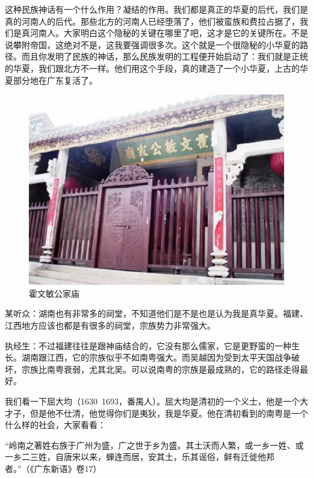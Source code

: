 这种民族神话有一个什么作用？凝结的作用。我们都是真正的华夏的后代，我们是真的河南人的后代。那些北方的河南人已经堕落了，他们被蛮族和费拉占据了，我们是真河南人。大家明白这个隐秘的关键在哪里了吧，这才是它的关键所在。不是说攀附帝国，这绝对不是，这我要强调很多次。这个就是一个很隐秘的小华夏的路径。而且你发明了民族的神话，那么民族发明的工程便开始启动了：我们就是正统的华夏，我们跟北方不一样。他们用这个手段，真的建造了一个小华夏，上古的华夏部分地在广东复活了。

\begin{figure}
	\centering
	\includegraphics[width=\textwidth]{images/image-59}
	\caption{霍文敏公家庙}
\end{figure}

\begin{quoted}
某听众：湖南也有非常多的祠堂，不知道他们是不是也是认为我是真华夏。福建、江西地方应该也都是有很多的祠堂，宗族势力非常强大。

执经生：不过福建往往是跟神庙结合的，它没有那么儒家，它是更野蛮的一种生长。湖南跟江西，它的宗族似乎不如南粤强大。而吴越因为受到太平天国战争破坏，宗族比南粤衰弱，尤其北吴。可以说南粤的宗族是最成熟的，它的路径走得最好。
\end{quoted}

我们看一下屈大均（1630~1693，番禺人）。屈大均是清初的一个义士，他是一个大才子，但是他不仕清，他觉得你们是夷狄，我是华夏。他在清初看到的南粤是一个什么样的社会，大家看看：

“岭南之著姓右族于广州为盛，广之世于乡为盛。其土沃而人繁，或一乡一姓、或一乡二三姓，自唐宋以来，蝉连而居，安其土，乐其谣俗，鲜有迁徙他邦者。”（《广东新语》卷17）

